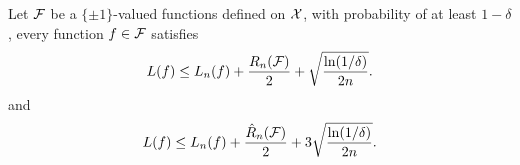 \begin{theorem} \label{thm:bnd-rdm}
Let ${\cal F}$ be a $\{\pm1\}$-valued functions defined on ${\cal X}$, with probability of at
least $1-\delta$, every function $f \in {\cal F}$ satisfies
\begin{equation}
L(f) \leq L_n(f) + \frac{R_n(\f)}{2}+\sqrt{\frac{\ln(1/\delta)}{2n}}. \label{eqn:bnd-rdm}
\end{equation}
and
\begin{equation}
L(f) \leq L_n(f) + \frac{\hat{R}_n(\f)}{2} + 3\sqrt{\frac{\ln(1/\delta)}{2n}}. \label{eqn:bnd-e-rdm}
\end{equation}
\end{theorem}


